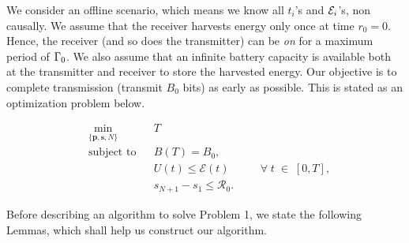 We consider an offline scenario, which means we know all $t_i$'s and $\mathcal{E}_i$'s, non causally. We assume that the receiver harvests energy only once at time $r_0=0$. Hence, the receiver (and so does the transmitter) can be \textit{on} for a maximum period of $\Gamma_0$. We also assume that an infinite battery capacity is available both at the transmitter and receiver to store the harvested energy. Our objective is to complete transmission (transmit $B_0$ bits) as early as possible. This is stated as an optimization problem below.

\begin{problem}
\begin{align}
&\min_{\{\textbf{p},\textbf{s},N\}}			&& T
\\
&\text{subject to} 				&& B(T)=B_0, 
\label{pb1_constraint_bits}
\\
&     										&& U(t)\le \mathcal{E}(t)  		&&& \forall \; t\;\in\;[0,T], \label{pb1_constraint_energy}
\\
&    										&& s_{N+1}-s_1\le \mathcal{R}_0.
\label{pb1_constraint_time}
\end{align}
\end{problem}
Before describing an algorithm to solve Problem 1, we state the following Lemmas, which shall help us construct our algorithm.



%